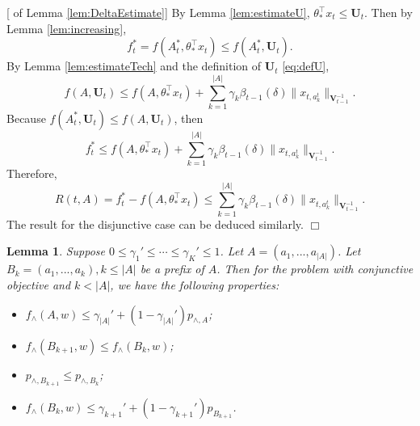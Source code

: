\documentclass{article}
\newcommand{\bU}{\mathbf{U}}
\newcommand{\bV}{\mathbf{V}}
\newcommand{\abs}[1]{\left| #1 \right|}
\newcommand{\norm}[1]{\| #1 \|}
\newtheorem{lemma}[theorem]{Lemma}%
\newenvironment{proof}{\noindent {\textbf{Proof. }}}{$\Box$ \medskip}
\begin{document}
\begin{proof}[ of Lemma \ref{lem:DeltaEstimate}]
By Lemma \ref{lem:estimateU}, $\theta_{\ast}^{\top}x_t \leq \bU_t$. Then by Lemma \ref{lem:increasing},
$$
f_t^{\ast} = f(A_t^{\ast}, \theta_{\ast}^{\top}x_t) \leq f(A_t^{\ast}, \bU_t).
$$
By Lemma \ref{lem:estimateTech} and the definition of $\bU_t$ \eqref{eq:defU},
$$
f(A, \bU_t) \leq f(A, \theta_{\ast}^{\top}x_t) + \sum_{k=1}^{\abs{A}} \gamma_k \beta_{t-1}(\delta)\norm{x_{t, a_k^t}}_{\bV_{t-1}^{-1}}.
$$
Because $f(A_t^{\ast}, \bU_t) \leq f(A, \bU_t)$, then 
$$
f_t^{\ast} \leq f(A, \theta_{\ast}^{\top}x_t) + \sum_{k=1}^{\abs{A}} \gamma_k \beta_{t-1}(\delta)\norm{x_{t, a_k^t}}_{\bV_{t-1}^{-1}}.
$$
Therefore,
$$
R(t, A) = f_t^{\ast} - f(A, \theta_{\ast}^{\top}x_t) \leq \sum_{k=1}^{\abs{A}} \gamma_k \beta_{t-1}(\delta)\norm{x_{t, a_k^t}}_{\bV_{t-1}^{-1}}.
$$
The result for the disjunctive case can be deduced similarly.
\end{proof}

\begin{lemma}
\label{lem:prefixRelation}
Suppose 
$0 \leq \gamma_1' \leq \cdots \leq \gamma_K' \leq 1$. Let $A = (a_1, ..., a_{\abs{A}})$. 
Let $B_k = (a_1, ..., a_k), k \leq \abs{A}$ be a prefix of $A$. Then for the problem with conjunctive objective and $k < \abs{A}$, we have the following properties:
\begin{itemize}
\item[(1)] $f_{\wedge}(A, w) \leq \gamma_{\abs{A}}' + (1 - \gamma_{\abs{A}}') p_{\wedge, A}$;
\item[(2)] $f_{\wedge}(B_{k+1}, w) \leq f_{\wedge}(B_k, w)$;
\item[(3)] $p_{\wedge, B_{k+1}} \leq p_{\wedge, B_k}$;
\item[(4)] $f_{\wedge}(B_k, w) \leq \gamma_{k+1}' + (1 - \gamma_{k+1}') p_{B_{k+1}}$.
\end{itemize}
\end{lemma}
\end{document}
